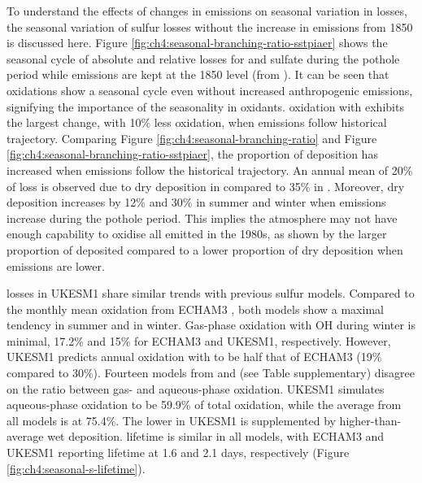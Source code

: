 To understand the effects of changes in emissions on seasonal variation in  losses, the seasonal variation of sulfur losses without the increase in  emissions from 1850 is discussed here. Figure \ref{fig:ch4:seasonal-branching-ratio-sstpiaer} shows the seasonal cycle of absolute and relative losses for  and sulfate during the pothole period while  emissions are kept at the 1850 level (from \sstpiaer{}). It can be seen that  oxidations show a seasonal cycle even without increased anthropogenic  emissions, signifying the importance of the seasonality in oxidants.  oxidation with  exhibits the largest change, with 10\% less oxidation, when  emissions follow historical trajectory. Comparing Figure \ref{fig:ch4:seasonal-branching-ratio} and Figure \ref{fig:ch4:seasonal-branching-ratio-sstpiaer}, the proportion of deposition has increased when  emissions follow the historical trajectory. An annual mean of 20\% of loss is observed due to dry deposition in \sstpiaer{} compared to 35\% in \histsst{}. Moreover,  dry deposition increases by 12\% and 30\% in summer and winter when emissions increase during the pothole period. This implies the atmosphere may not have enough capability to oxidise all  emitted in the 1980s, as shown by the larger proportion of  deposited compared to a lower proportion of dry deposition when  emissions are lower.

 losses in UKESM1 share similar trends with previous sulfur models. Compared to the monthly mean  oxidation from ECHAM3 \citep{feichterSimulationTroposphericSulfur1996}, both models show a maximal  tendency in summer and  in winter. Gas-phase oxidation with OH during winter is minimal, 17.2\% and 15\% for ECHAM3 and UKESM1, respectively. However, UKESM1 predicts annual  oxidation with  to be half that of ECHAM3 (19\% compared to 30\%). Fourteen models from \citet{spracklenGlobalOfflineModel2005} and \citet{mulcahyDescriptionEvaluationAerosol2020} (see Table supplementary) disagree on the ratio between gas- and aqueous-phase oxidation. UKESM1 simulates aqueous-phase oxidation to be 59.9\% of total oxidation, while the average from all models is at 75.4\%. The lower  in UKESM1 is supplemented by higher-than-average wet deposition.  lifetime is similar in all models, with ECHAM3 and UKESM1 reporting  lifetime at 1.6 and 2.1 days, respectively (Figure \ref{fig:ch4:seasonal-s-lifetime}). 

